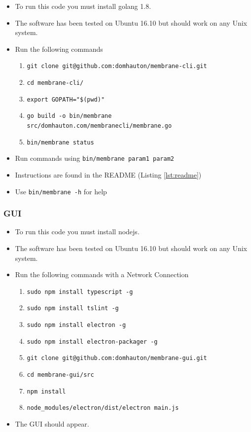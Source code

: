 \documentclass[11pt, a4paper, twoside]{report}
\def\code#1{\texttt{#1}}
\begin{document}
\begin{itemize}
 \item To run this code you must install golang 1.8.
 \item The software has been tested on Ubuntu 16.10 but should work on any Unix system.
 \item Run the following commands
 \begin{enumerate}
  \item \code{git clone git@github.com:domhauton/membrane-cli.git}
  \item \code{cd membrane-cli/}
  \item \code{export GOPATH="\$(pwd)"}
  \item \code{go build -o bin/membrane src/domhauton.com/membranecli/membrane.go}
  \item \code{bin/membrane status}
 \end{enumerate}
 \item Run commands using \code{bin/membrane param1 param2}
 \item Instructions are found in the README (Listing \ref{lst:readme})
 \item Use \code{bin/membrane -h} for help
\end{itemize}

\subsubsection{GUI}

\begin{itemize}
 \item To run this code you must install nodejs.
 \item The software has been tested on Ubuntu 16.10 but should work on any Unix system.
 \item Run the following commands with a Network Connection
 \begin{enumerate}
  \item \code{sudo npm install typescript -g}
  \item \code{sudo npm install tslint -g}
  \item \code{sudo npm install electron -g}
  \item \code{sudo npm install electron-packager -g}
  
  \item \code{git clone git@github.com:domhauton/membrane-gui.git}
  \item \code{cd membrane-gui/src}
  \item \code{npm install}
  \item \code{node\_modules/electron/dist/electron main.js}
 \end{enumerate}
 \item The GUI should appear.
\end{itemize}
\end{document}
